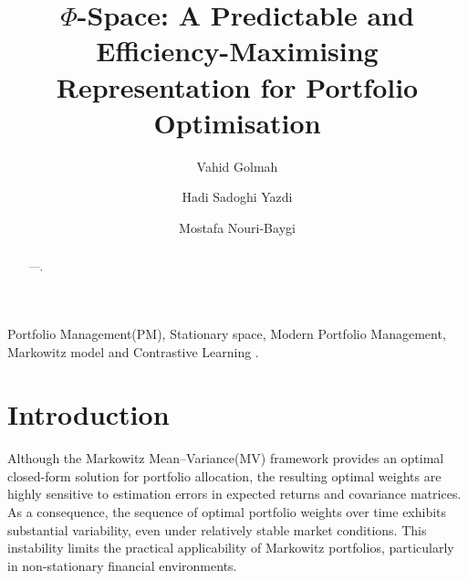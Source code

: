 \documentclass[preprint,12pt]{elsarticle}
\theoremstyle{plain}
\theoremstyle{definition}
\begin{document}
	
	\begin{frontmatter}
		\setlength{\parindent}{1em} %
		
		
		
		\title{$\Phi$-Space: A Predictable and Efficiency-Maximising Representation for Portfolio Optimisation}
		
		
		\author{Vahid Golmah}
		\author{Hadi Sadoghi Yazdi }
		\author{Mostafa Nouri-Baygi} %
		\address{Ferdowsi University of Mashhad,Department of Computer Engineering, Mashhad, Iran} %
	
	\begin{abstract}%
		---.
	\end{abstract}
	\begin{keyword}
		Portfolio Management(PM), Stationary space, Modern Portfolio Management, Markowitz model and Contrastive Learning .
	\end{keyword}
	
\end{frontmatter}
\section{Introduction}
Although the Markowitz Mean–Variance(MV) framework\cite{markowitz1952} provides an optimal closed-form solution for portfolio allocation, the resulting optimal weights are highly sensitive to estimation errors in expected returns and covariance matrices. As a consequence, the sequence of optimal portfolio weights over time exhibits substantial variability, even under relatively stable market conditions. This instability limits the practical applicability of Markowitz portfolios, particularly in non-stationary financial environments\cite{loukeris2025effective,irfani2023portfolio,alzaman2025optimizing,chen2024multi}.
\end{document}
